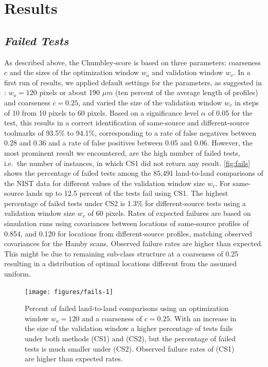 \documentclass[12pt]{article}
\begin{document}
\hypertarget{results}{%
\section*{Results}\label{results}}

\hypertarget{failed-tests}{%
\subsection*{\texorpdfstring{\emph{Failed
Tests}}{Failed Tests}}\label{failed-tests}}

As described above, the Chumbley-score is based on three parameters:
coarseness \(c\) and the sizes of the optimization window \(w_o\) and
validation window \(w_v\). In a first run of results, we applied default
settings for the parameters, as suggested in \citet{hadler}:
\(w_o = 120\) pixels or about 190 \(\mu m\) (ten percent of the average
length of profiles) and coarseness \(c = 0.25\), and varied the size of
the validation window \(w_v\) in steps of 10 from 10 pixels to 60
pixels. Based on a significance level \(\alpha\) of 0.05 for the test,
this results in a correct identification of same-source and
different-source toolmarks of 93.5\% to 94.1\%, corresponding to a rate
of false negatives between 0.28 and 0.36 and a rate of false positives
between 0.05 and 0.06. However, the most prominent result we
encountered, are the high number of failed tests, i.e.~the number of
instances, in which CS1 did not return any result. \autoref{fig:fails}
shows the percentage of failed tests among the 85,491 land-to-land
comparisons of the NIST data for different values of the validation
window size \(w_v\). For same-source lands up to 12.5 percent of the
tests fail using CS1. The highest percentage of failed tests under CS2
is 1.3\% for different-source tests using a validation window size
\(w_v\) of 60 pixels. Rates of expected failures are based on simulation
runs using covariances between locations of same-source profiles of
0.854, and 0.120 for locations from different-source profiles, matching
observed covariances for the Hamby scans. Observed failure rates are
higher than expected. This might be due to remaining sub-class structure
at a coarseness of 0.25 resulting in a distribution of optimal locations
different from the assumed uniform.

\begin{figure}

{\centering \texttt{[image: figures/fails-1]} 

}

\caption{Percent of failed land-to-land comparisons using an optimization window $w_o = 120$ and a coarseness of $c = 0.25$. With an increase in the size of the validation window  a higher percentage of tests fails under both methods (CS1) and (CS2), but the percentage of failed tests is much smaller under (CS2). Observed failure rates of (CS1) are higher than expected rates.}\label{fig:fails}
\end{figure}
\end{document}
